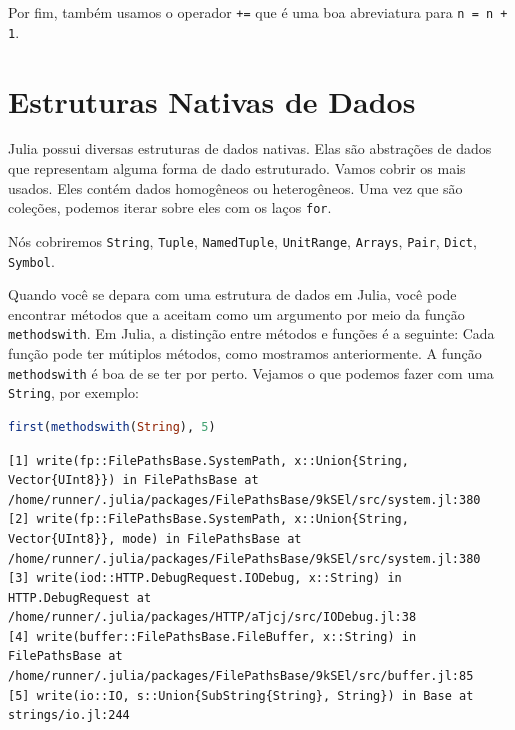 \documentclass[
  notoc %
]{tufte-book}
\newcommand{\passthrough}[1]{#1}
\begin{document}
Por fim, também usamos o operador \passthrough{\lstinline!+=!} que é uma
boa abreviatura para \passthrough{\lstinline!n = n + 1!}.

\hypertarget{sec:data_structures}{%
\section{Estruturas Nativas de Dados}\label{sec:data_structures}}

Julia possui diversas estruturas de dados nativas. Elas são abstrações
de dados que representam alguma forma de dado estruturado. Vamos cobrir
os mais usados. Eles contém dados homogêneos ou heterogêneos. Uma vez
que são coleções, podemos iterar sobre eles com os laços
\passthrough{\lstinline!for!}.

Nós cobriremos \passthrough{\lstinline!String!},
\passthrough{\lstinline!Tuple!}, \passthrough{\lstinline!NamedTuple!},
\passthrough{\lstinline!UnitRange!}, \passthrough{\lstinline!Arrays!},
\passthrough{\lstinline!Pair!}, \passthrough{\lstinline!Dict!},
\passthrough{\lstinline!Symbol!}.

Quando você se depara com uma estrutura de dados em Julia, você pode
encontrar métodos que a aceitam como um argumento por meio da função
\passthrough{\lstinline!methodswith!}. Em Julia, a distinção entre
métodos e funções é a seguinte: Cada função pode ter mútiplos métodos,
como mostramos anteriormente. A função
\passthrough{\lstinline!methodswith!} é boa de se ter por perto. Vejamos
o que podemos fazer com uma \passthrough{\lstinline!String!}, por
exemplo:

\begin{lstlisting}[language=Julia]
first(methodswith(String), 5)
\end{lstlisting}

\begin{lstlisting}[language=Output]
[1] write(fp::FilePathsBase.SystemPath, x::Union{String, Vector{UInt8}}) in FilePathsBase at /home/runner/.julia/packages/FilePathsBase/9kSEl/src/system.jl:380
[2] write(fp::FilePathsBase.SystemPath, x::Union{String, Vector{UInt8}}, mode) in FilePathsBase at /home/runner/.julia/packages/FilePathsBase/9kSEl/src/system.jl:380
[3] write(iod::HTTP.DebugRequest.IODebug, x::String) in HTTP.DebugRequest at /home/runner/.julia/packages/HTTP/aTjcj/src/IODebug.jl:38
[4] write(buffer::FilePathsBase.FileBuffer, x::String) in FilePathsBase at /home/runner/.julia/packages/FilePathsBase/9kSEl/src/buffer.jl:85
[5] write(io::IO, s::Union{SubString{String}, String}) in Base at strings/io.jl:244
\end{lstlisting}
\end{document}
